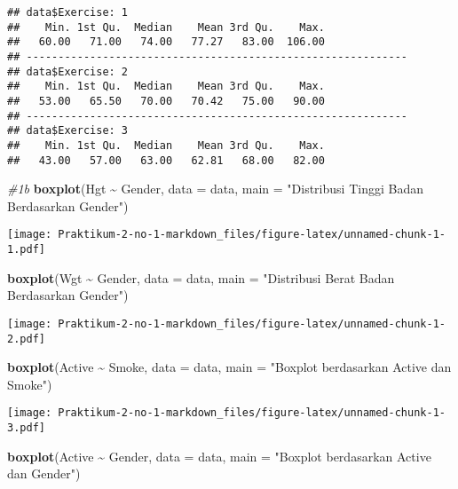 \documentclass[
]{article}
\newenvironment{Shaded}{\begin{snugshade}}{\end{snugshade}}
\newcommand{\AttributeTok}[1]{\textcolor[rgb]{0.13,0.29,0.53}{#1}}
\newcommand{\CommentTok}[1]{\textcolor[rgb]{0.56,0.35,0.01}{\textit{#1}}}
\newcommand{\FunctionTok}[1]{\textcolor[rgb]{0.13,0.29,0.53}{\textbf{#1}}}
\newcommand{\NormalTok}[1]{#1}
\newcommand{\SpecialCharTok}[1]{\textcolor[rgb]{0.81,0.36,0.00}{\textbf{#1}}}
\newcommand{\StringTok}[1]{\textcolor[rgb]{0.31,0.60,0.02}{#1}}
\begin{document}
\begin{verbatim}
## data$Exercise: 1
##    Min. 1st Qu.  Median    Mean 3rd Qu.    Max. 
##   60.00   71.00   74.00   77.27   83.00  106.00 
## ------------------------------------------------------------ 
## data$Exercise: 2
##    Min. 1st Qu.  Median    Mean 3rd Qu.    Max. 
##   53.00   65.50   70.00   70.42   75.00   90.00 
## ------------------------------------------------------------ 
## data$Exercise: 3
##    Min. 1st Qu.  Median    Mean 3rd Qu.    Max. 
##   43.00   57.00   63.00   62.81   68.00   82.00
\end{verbatim}

\begin{Shaded}
\begin{Highlighting}[]
\CommentTok{\#1b}
\FunctionTok{boxplot}\NormalTok{(Hgt }\SpecialCharTok{\textasciitilde{}}\NormalTok{ Gender, }\AttributeTok{data =}\NormalTok{ data, }\AttributeTok{main =} \StringTok{"Distribusi Tinggi Badan Berdasarkan Gender"}\NormalTok{)}
\end{Highlighting}
\end{Shaded}

\texttt{[image: Praktikum-2-no-1-markdown\_files/figure-latex/unnamed-chunk-1-1.pdf]}

\begin{Shaded}
\begin{Highlighting}[]
\FunctionTok{boxplot}\NormalTok{(Wgt }\SpecialCharTok{\textasciitilde{}}\NormalTok{ Gender, }\AttributeTok{data =}\NormalTok{ data, }\AttributeTok{main =} \StringTok{"Distribusi Berat Badan Berdasarkan Gender"}\NormalTok{)}
\end{Highlighting}
\end{Shaded}

\texttt{[image: Praktikum-2-no-1-markdown\_files/figure-latex/unnamed-chunk-1-2.pdf]}

\begin{Shaded}
\begin{Highlighting}[]
\FunctionTok{boxplot}\NormalTok{(Active }\SpecialCharTok{\textasciitilde{}}\NormalTok{ Smoke, }\AttributeTok{data =}\NormalTok{ data, }\AttributeTok{main =} \StringTok{"Boxplot berdasarkan Active dan Smoke"}\NormalTok{)}
\end{Highlighting}
\end{Shaded}

\texttt{[image: Praktikum-2-no-1-markdown\_files/figure-latex/unnamed-chunk-1-3.pdf]}

\begin{Shaded}
\begin{Highlighting}[]
\FunctionTok{boxplot}\NormalTok{(Active }\SpecialCharTok{\textasciitilde{}}\NormalTok{ Gender, }\AttributeTok{data =}\NormalTok{ data, }\AttributeTok{main =} \StringTok{"Boxplot berdasarkan Active dan Gender"}\NormalTok{)}
\end{Highlighting}
\end{Shaded}
\end{document}
